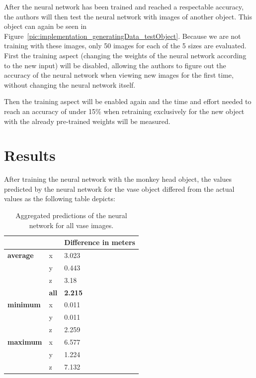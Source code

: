 After the neural network has been trained and reached a respectable accuracy, the authors will then test the neural network with images of another object. This object can again be seen in Figure~\ref{pic:implementation_generatingData_testObject}. Because we are not training with these images, only 50 images for each of the 5 sizes are evaluated. First the training aspect (changing the weights of the neural network according to the new input) will be disabled, allowing the authors to figure out the accuracy of the neural network when viewing new images for the first time, without changing the neural network itself.

Then the training aspect will be enabled again and the time and effort needed to reach an accuracy of under 15\% when retraining exclusively for the new object with the already pre-trained weights will be measured.

\section{Results}
After training the neural network with the monkey head object, the values predicted by the neural network for the vase object differed from the actual values as the following table depicts:

\begin{table}[h!]
	\begin{tabular}{ll|l}
		&     & \textbf{Difference in meters} \\
		\hline
		\textbf{average} & x   & 3.023                         \\
		& y   & 0.443                         \\
		& z   & 3.18                          \\
		& \textbf{all} & \textbf{2.215}                         \\
		\hline
		\textbf{minimum} & x   & 0.011                         \\
		& y   & 0.011                         \\
		& z   & 2.259                         \\
		\hline
		\textbf{maximum} & x   & 6.577                         \\
		& y   & 1.224                         \\
		& z   & 7.132                                                  
	\end{tabular}
	\caption{Aggregated predictions of the neural network for all vase images.}
\end{table}

